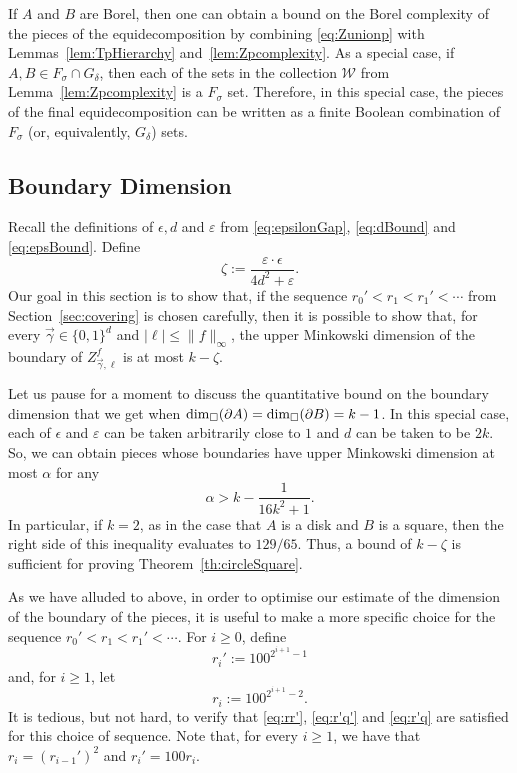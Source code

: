 \documentclass[12pt,a4paper]{amsart}
\numberwithin{equation}{section}
\theoremstyle{definition}
\begin{document}
If $A$ and $B$ are Borel, then one can obtain a bound on the Borel complexity of the pieces of the equidecomposition by combining \eqref{eq:Zunionp} with Lemmas~\ref{lem:TpHierarchy} and~\ref{lem:Zpcomplexity}. As a special case, if $A,B\in F_\sigma\cap G_\delta$, then each of the sets in the collection $\mathcal{W}$ from Lemma~\ref{lem:Zpcomplexity} is a $F_\sigma$ set. Therefore, in this special case, the pieces of the final equidecomposition can be written as a finite Boolean combination of $F_\sigma$ (or, equivalently, $G_\delta$) sets. 

\subsection{Boundary Dimension}

 Recall the definitions of $\epsilon,d$ and $\varepsilon$ from \eqref{eq:epsilonGap}, \eqref{eq:dBound} and \eqref{eq:epsBound}. Define
\begin{equation}
\label{eq:zeta}
\zeta:=\frac{\varepsilon\cdot \epsilon}{4d^2+\varepsilon}.
\end{equation}
Our goal in this section is to show that, if the sequence $r_0'<r_1<r_1'<\cdots$ from Section~\ref{sec:covering} is chosen carefully, then it is possible to show that, for every $\vec{\gamma}\in\{0,1\}^d$ and $|\ell|\leq \|f\|_\infty$, the upper Minkowski dimension of the boundary of $Z_{\vec{\gamma},\ell}^f$ is at most $k-\zeta$.

Let us pause for a moment to discuss the quantitative bound on the boundary dimension that we get when $\operatorname{dim}_\square(\partial A)=\operatorname{dim}_\square(\partial B)=k-1$. In this special case, each of $\epsilon$ and $\varepsilon$ can be taken arbitrarily close to $1$ and $d$ can be taken to be $2k$. So, we can obtain pieces whose boundaries have upper Minkowski dimension at most $\alpha$ for any
\[\alpha > k - \frac{1}{16k^2+1}.\]
In particular, if $k=2$, as in the case that $A$ is a disk and $B$ is a square, then the right side of this inequality evaluates to $129/65$. Thus, a bound of $k-\zeta$ is sufficient for proving Theorem~\ref{th:circleSquare}.

As we have alluded to above, in order to optimise our estimate of the dimension of the boundary of the pieces, it is useful to make a more specific choice for the sequence $r_0'<r_1<r_1'<\cdots$. For $i\geq0$, define
\begin{equation}\label{eq:ri'specific}r_{i}':=100^{2^{i+1} - 1}\end{equation}
and, for $i\geq 1$, let
\begin{equation}\label{eq:rispecific}r_i:=100^{2^{i+1} - 2}.\end{equation}
It is tedious, but not hard, to verify that \eqref{eq:rr'}, \eqref{eq:r'q'} and \eqref{eq:r'q} are satisfied for this choice of sequence. Note that, for every $i\geq1$, we have that $r_i=\left(r_{i-1}'\right)^2$ and $r_i'=100r_i$.  
\end{document}
